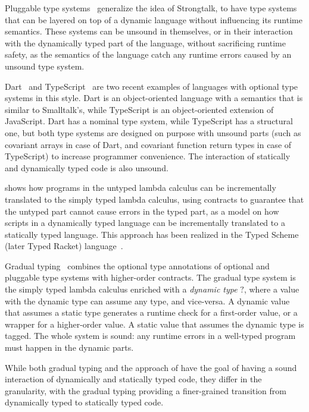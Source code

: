 \documentclass{sig-alternate}
\begin{document}
Pluggable type systems~\citep{bracha2004pluggable} generalize
the idea of Strongtalk, to have type systems that can be
layered on top of a dynamic language without influencing
its runtime semantics. These systems can be unsound in
themselves, or in their interaction with the dynamically
typed part of the language, without sacrificing runtime
safety, as the semantics of the language catch any
runtime errors caused by an unsound type system.

Dart~\citep{dart} and TypeScript~\citep{typescript} are
two recent examples of languages with optional type systems
in this style. Dart is an object-oriented language with
a semantics that is similar to Smalltalk's, while TypeScript
is an object-oriented extension of JavaScript. Dart has a
nominal type system, while TypeScript has a structural one,
but both type systems are designed on purpose with unsound
parts (such as covariant arrays in case of Dart, and
covariant function return types in case of TypeScript) to
increase programmer convenience. The interaction of
statically and dynamically typed code is also unsound.

\citet{tobin-hochstadt2006ims} shows how programs
in the untyped lambda calculus can be incrementally
translated to the simply typed lambda calculus, using
contracts to guarantee that the untyped part cannot
cause errors in the typed part, as a model on how
scripts in a dynamically typed language can be
incrementally translated to a statically typed
language. This approach has been realized in the
Typed Scheme (later Typed Racket) language~\citep{tobin-hochstadt2008ts,tobin:occur}. 

Gradual typing~\citep{siek2006gradual} combines the
optional type annotations of optional and pluggable
type systems with higher-order contracts. The gradual
type system is the simply typed lambda calculus enriched
with a {\em dynamic type} $?$, where a value with the
dynamic type can assume any type, and vice-versa.
A dynamic value that assumes a static type generates
a runtime check for a first-order value, or a wrapper
for a higher-order value. A static value that assumes
the dynamic type is tagged. The whole system is sound:
any runtime errors in a well-typed program must happen
in the dynamic parts. 

While both gradual typing and the approach of
\citep{tobin-hochstadt2006ims} have the goal of
having a sound interaction of dynamically and statically
typed code, they differ in the granularity, with the
gradual typing providing a finer-grained transition from
dynamically typed to statically typed code.
\end{document}
